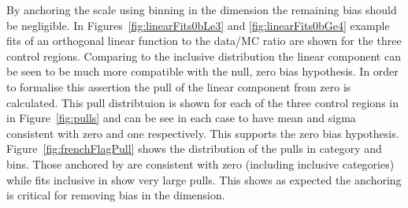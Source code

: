 By anchoring the scale using binning in the \ht dimension the remaining
bias should be negligible. In Figures~\ref{fig:linearFits0bLe3} and \ref{fig:linearFits0bGe4} 
example fits of an orthogonal linear function to the data/MC ratio 
are shown for the three control regions. Comparing to the inclusive distribution 
the linear component can be seen to be much more compatible with the null, 
zero bias hypothesis. In order to formalise this assertion 
the pull of the linear component from zero is calculated.
This pull distribtuion is shown for each of the three control regions in
in Figure~\ref{fig:pulls} and can be see in each case to have mean and sigma
consistent with zero and one respectively. This supports the zero
bias hypothesis. Figure~\ref{fig:frenchFlagPull} shows the distribution of the pulls 
in category and \ht bins. Those anchored by \ht are consistent
with zero (including inclusive categories) while fits inclusive in \ht
show very large pulls. This shows as expected the \ht anchoring
is critical for removing bias in the \mht dimension.  

